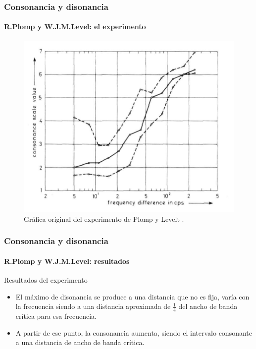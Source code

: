 \documentclass[12 pt]{beamer}
\begin{document}
\begin{frame}{13}
    \frametitle{Consonancia y disonancia}
    
    \framesubtitle{R.Plomp y W.J.M.Level: el experimento}
    
    \begin{figure}
        \centering
        \includegraphics[scale = .5]{Datos1.png}
        \caption{Gráfica original del experimento de Plomp y Levelt \cite{PL}.}
    \end{figure}
    
\end{frame}

\begin{frame}{14}
    \frametitle{Consonancia y disonancia}
    
    \framesubtitle{R.Plomp y W.J.M.Level: resultados}
    
    \begin{block}{Resultados del experimento}
        \begin{itemize}
        \item El máximo de disonancia se produce a una distancia que no es fija, varía con la frecuencia siendo a una distancia aproximada de $\frac{1}{4}$ del ancho de banda crítica para esa frecuencia.
        \item A partir de ese punto, la consonancia aumenta, siendo el intervalo consonante a una distancia de ancho de banda crítica.
    \end{itemize}
    \end{block}
    
        
\end{frame}
\end{document}
